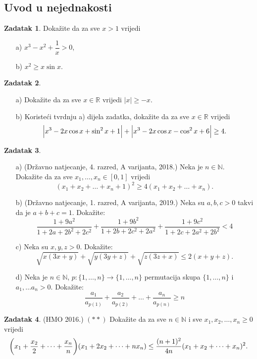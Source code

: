 \documentclass{book}
\let\originalleft\left
\let\originalright\right
\renewcommand{\left}{\mathopen{}\mathclose\bgroup\originalleft}
\renewcommand{\right}{\aftergroup\egroup\originalright}
\theoremstyle{definition}
\theoremstyle{definition}
\newtheorem{exercise}{Zadatak}
\theoremstyle{remark}
\begin{document}
\subsection*{Uvod u nejednakosti}
\begin{exercise}
Dokažite da za sve $x>1$ vrijedi 
\begin{itemize}
\item[a)] $x^3-x^2+\dfrac{1}{x}>0$,
\item[b)] $x^2\geq x\sin{x}$.
\end{itemize}
\end{exercise}
\begin{exercise} \textbf{}
\begin{itemize}
\item[a)] Dokažite da za sve $x\in \mathbb{R}$ vrijedi $|x|\geq -x$.
\item[b)] Koristeći tvrdnju a) dijela zadatka, dokažite da za sve $x\in \mathbb{R}$ vrijedi $$\left|x^{3}-2x\cos{x}+\sin^2{x}+1\right|+\left|x^{3}-2x\cos{x}-\cos^2{x}+6\right|\geq 4.$$ 
\end{itemize}
\end{exercise}
\begin{exercise} \textbf{}
\begin{itemize}
\item[a)] (Državno natjecanje, 4. razred, A varijanta, 2018.) Neka je $n\in \mathbb{N}$. Dokažite da za sve $x_1, \dots, x_n\in [0, 1]$ vrijedi
$$(x_1+x_2+\dots+x_n+1)^2\geq 4(x_1+x_2+\dots+x_n).$$
\item[b)] (Državno natjecanje, 1. razred, A varijanta, 2019.) Neka su $a, b, c>0$ takvi da je $a+b+c=1$. Dokažite:
$$\dfrac{1+9a^2}{1+2a+2b^2+2c^2}+\dfrac{1+9b^2}{1+2b+2c^2+2a^2}+\dfrac{1+9c^2}{1+2c+2a^2+2b^2}<4$$
\item[c)] Neka su $x, y, z>0$. Dokažite:
$$\sqrt{x(3x+y)}+\sqrt{y(3y+z)}+\sqrt{z(3z+x)} \leq 2(x+y+z).$$
\item[d)] Neka je $n\in \mathbb{N}$, $p : \{1, \dots, n\}\to \{1,\dots, n\}$ permutacija skupa $\{1, \dots, n\}$ i $a_1, \dots a_n>0$. Dokažite:
$$\dfrac{a_1}{a_{p(1)}}+\dfrac{a_2}{a_{p(2)}}+\dots+\dfrac{a_n}{a_{p(n)}}\geq n$$
\end{itemize}
\end{exercise}
\begin{exercise}(HMO 2016.) $(**)$
Dokažite da za sve $n\in \mathbb{N}$ i sve $x_1, x_2, \dots, x_n\geq 0$ vrijedi
$$\left(x_1+\dfrac{x_2}{2}+\dots+\dfrac{x_n}{n}\right)\left(x_1+2x_2+\dots+nx_n\right)\leq \dfrac{(n+1)^2}{4n}(x_1+x_2+\dots+x_n)^2.$$
\end{exercise}
\end{document}
